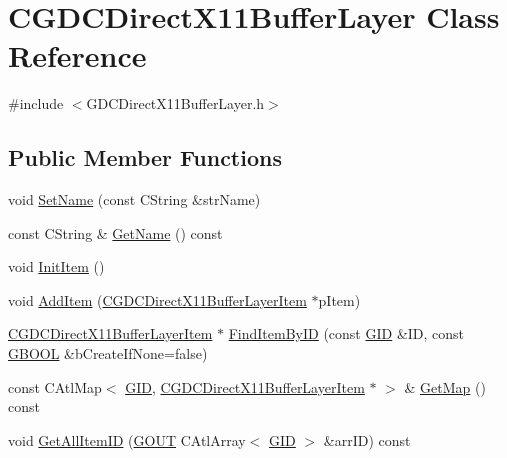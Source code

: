 \hypertarget{class_c_g_d_c_direct_x11_buffer_layer}{}\section{C\+G\+D\+C\+Direct\+X11\+Buffer\+Layer Class Reference}
\label{class_c_g_d_c_direct_x11_buffer_layer}


{\ttfamily \#include $<$G\+D\+C\+Direct\+X11\+Buffer\+Layer.\+h$>$}

\subsection*{Public Member Functions}
\begin{DoxyCompactItemize}
\item 
void \hyperlink{class_c_g_d_c_direct_x11_buffer_layer_a0e071fedeb529e654264223267194285}{Set\+Name} (const C\+String \&str\+Name)
\item 
const C\+String \& \hyperlink{class_c_g_d_c_direct_x11_buffer_layer_a79f2e361adea18937c665b64d1fb9af3}{Get\+Name} () const 
\item 
void \hyperlink{class_c_g_d_c_direct_x11_buffer_layer_ae90065e7b4b8416f0658f72cbe18c978}{Init\+Item} ()
\item 
void \hyperlink{class_c_g_d_c_direct_x11_buffer_layer_ab86545ea75a894b793a349e8fcbe794d}{Add\+Item} (\hyperlink{class_c_g_d_c_direct_x11_buffer_layer_item}{C\+G\+D\+C\+Direct\+X11\+Buffer\+Layer\+Item} $\ast$p\+Item)
\item 
\hyperlink{class_c_g_d_c_direct_x11_buffer_layer_item}{C\+G\+D\+C\+Direct\+X11\+Buffer\+Layer\+Item} $\ast$ \hyperlink{class_c_g_d_c_direct_x11_buffer_layer_aa0bf8672660b7b2df45f46d40e4c0916}{Find\+Item\+By\+I\+D} (const \hyperlink{_g_types_8h_a5b96ecb16d8e437977d12cd40aa6f6d8}{G\+I\+D} \&I\+D, const \hyperlink{_g_types_8h_a2901915743626352a6820c5405f556dc}{G\+B\+O\+O\+L} \&b\+Create\+If\+None=false)
\item 
const C\+Atl\+Map$<$ \hyperlink{_g_types_8h_a5b96ecb16d8e437977d12cd40aa6f6d8}{G\+I\+D}, \hyperlink{class_c_g_d_c_direct_x11_buffer_layer_item}{C\+G\+D\+C\+Direct\+X11\+Buffer\+Layer\+Item} $\ast$ $>$ \& \hyperlink{class_c_g_d_c_direct_x11_buffer_layer_a10e1f6026aac649406e3573bc1010d60}{Get\+Map} () const 
\item 
void \hyperlink{class_c_g_d_c_direct_x11_buffer_layer_a54f3d35d944100efe39c96fdca09088b}{Get\+All\+Item\+I\+D} (\hyperlink{_g_types_8h_a0858ec221262e635612871d70ca233ad}{G\+O\+U\+T} C\+Atl\+Array$<$ \hyperlink{_g_types_8h_a5b96ecb16d8e437977d12cd40aa6f6d8}{G\+I\+D} $>$ \&arr\+I\+D) const 

\end{DoxyCompactItemize}
